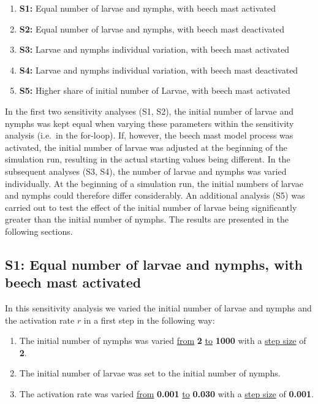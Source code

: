 \documentclass[a4paper, 11pt]{scrartcl}
\begin{document}
\begin{enumerate}
\item[] \textbf{S1:} Equal number of larvae and nymphs, with beech mast activated
\item[] \textbf{S2:} Equal number of larvae and nymphs, with beech mast deactivated
\item[] \textbf{S3:} Larvae and nymphs individual variation, with beech mast activated
\item[] \textbf{S4:} Larvae and nymphs individual variation, with beech mast deactivated
\item[] \textbf{S5:} Higher share of initial number of Larvae, with beech mast activated
\end{enumerate}

In the first two sensitivity analyses (S1, S2), the initial number of larvae and nymphs was kept equal when varying these parameters within the sensitivity analysis (i.e.\ in
the for-loop). If, however, the beech mast model process was activated, the initial number of larvae was adjusted at the beginning of the simulation run, resulting in the actual
starting values being different. In the subsequent analyses (S3, S4), the number of larvae and nymphs was varied individually. At the beginning of a simulation run, the initial
numbers of larvae and nymphs could therefore differ considerably. An additional analysis (S5) was carried out to test the effect of the initial number of larvae being
significantly greater than the initial number of nymphs. The results are presented in the following sections.


\subsection{S1: Equal number of larvae and nymphs, with beech mast activated}
In this sensitivity analysis we varied the initial number of larvae and nymphs and the activation rate $r$ in a first step in the following way:

\begin{enumerate}
\item The initial number of nymphs was varied \underline{from} \textbf{2} \underline{to} \textbf{1000} with a \underline{step size} of \textbf{2}.
\item The initial number of larvae was set to the initial number of nymphs.
\item The activation rate was varied \underline{from} \textbf{0.001} \underline{to} \textbf{0.030} with a \underline{step size} of \textbf{0.001}.
\end{enumerate}
\end{document}
